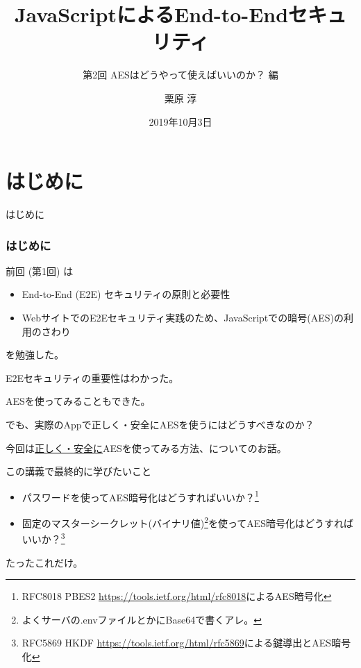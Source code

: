 \documentclass[12pt,dvipdfmx]{beamer}
\title[E2E Security with JS 02]{JavaScriptによるEnd-to-Endセキュリティ}
\subtitle{第2回 AESはどうやって使えばいいのか？ 編}
\author[Jun Kurihara]{栗原 淳}
\institute[]{}
\date[Oct. 3, 2019]{2019年10月3日}
\begin{document}
\begin{frame}
\titlepage
\end{frame}

\section{はじめに}
\begin{frame}
 \centering
 {\Large はじめに}
\end{frame}

\begin{frame}
\frametitle{はじめに}
前回 (第1回) は
\begin{itemize}
 \item End-to-End (E2E) セキュリティの原則と必要性
 \item WebサイトでのE2Eセキュリティ実践のため、JavaScriptでの暗号(AES)の利用のさわり
\end{itemize}
を勉強した。

\vspace{2ex}

E2Eセキュリティの重要性はわかった。

AESを使ってみることもできた。

\vspace{2ex}

でも、実際のAppで\alert{正しく・安全にAESを使うにはどうすべきなのか？}
\end{frame}

\begin{frame}
今回は\underline{正しく・安全に}AESを使ってみる方法、についてのお話。

\begin{block}{\small この講義で最終的に学びたいこと}
\begin{itemize}
\item パスワードを使ってAES暗号化はどうすればいいか？\footnote[frame]{\scriptsize RFC8018 PBES2 \url{https://tools.ietf.org/html/rfc8018}によるAES暗号化}
\item 固定のマスターシークレット(バイナリ値)\footnote[frame]{\scriptsize よくサーバの.envファイルとかにBase64で書くアレ。}を使ってAES暗号化はどうすればいいか？\footnote[frame]{\scriptsize RFC5869 HKDF \url{https://tools.ietf.org/html/rfc5869}による鍵導出とAES暗号化}
\end{itemize}
\end{block}

\vspace{2ex}

たったこれだけ。

\end{frame}
\end{document}
